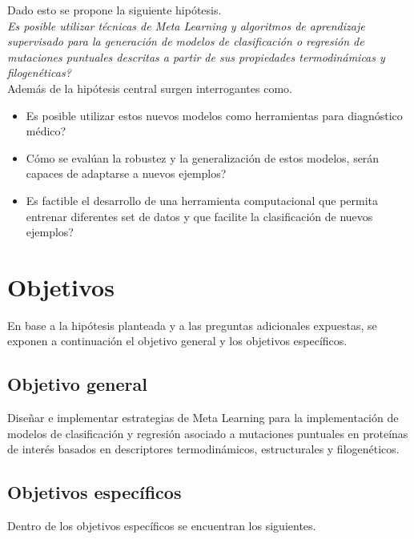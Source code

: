 Dado esto se propone la siguiente hipótesis.\\

\textit{Es posible utilizar técnicas de Meta Learning y algoritmos de aprendizaje supervisado para la generación de modelos de clasificación o regresión de mutaciones puntuales descritas a partir de sus propiedades termodinámicas y filogenéticas?}\\

Además de la hipótesis central surgen interrogantes como.

\begin{itemize}
	
	\item Es posible utilizar estos nuevos modelos como herramientas para diagnóstico médico?
	\item Cómo se evalúan la robustez y la generalización de estos modelos, serán capaces de adaptarse a nuevos ejemplos?
	\item Es factible el desarrollo de una herramienta computacional que permita entrenar diferentes set de datos y que facilite la clasificación de nuevos ejemplos?
	
\end{itemize}

\section{Objetivos}

En base a la hipótesis planteada y a las preguntas adicionales expuestas, se exponen a continuación el objetivo general y los objetivos específicos.

\subsection{Objetivo general}

Diseñar e implementar estrategias de Meta Learning para la implementación de modelos de clasificación y regresión asociado a mutaciones puntuales en proteínas de interés basados en descriptores termodinámicos, estructurales y filogenéticos.

\subsection{Objetivos específicos}

Dentro de los objetivos específicos se encuentran los siguientes.

